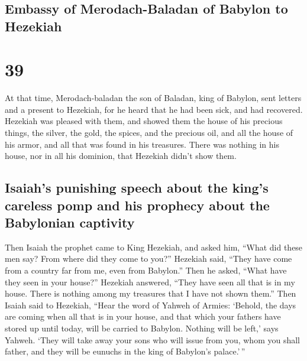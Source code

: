\hypertarget{embassy-of-merodach-baladan-of-babylon-to-hezekiah}{%
\subsection{Embassy of Merodach-Baladan of Babylon to
Hezekiah}\label{embassy-of-merodach-baladan-of-babylon-to-hezekiah}}

\hypertarget{section-38}{%
\section{39}\label{section-38}}

 At that time, Merodach-baladan the son of Baladan, king
of Babylon, sent letters and a present to Hezekiah, for he heard that he
had been sick, and had recovered.  Hezekiah was pleased
with them, and showed them the house of his precious things, the silver,
the gold, the spices, and the precious oil, and all the house of his
armor, and all that was found in his treasures. There was nothing in his
house, nor in all his dominion, that Hezekiah didn't show them.

\hypertarget{isaiahs-punishing-speech-about-the-kings-careless-pomp-and-his-prophecy-about-the-babylonian-captivity}{%
\subsection{Isaiah's punishing speech about the king's careless pomp and
his prophecy about the Babylonian
captivity}\label{isaiahs-punishing-speech-about-the-kings-careless-pomp-and-his-prophecy-about-the-babylonian-captivity}}

 Then Isaiah the prophet came to King Hezekiah, and asked
him, ``What did these men say? From where did they come to you?''
Hezekiah said, ``They have come from a country far from me, even from
Babylon.''  Then he asked, ``What have they seen in your
house?'' Hezekiah answered, ``They have seen all that is in my house.
There is nothing among my treasures that I have not shown them.''
 Then Isaiah said to Hezekiah, ``Hear the word of Yahweh
of Armies:  `Behold, the days are coming when all that is
in your house, and that which your fathers have stored up until today,
will be carried to Babylon. Nothing will be left,' says Yahweh.
 `They will take away your sons who will issue from you,
whom you shall father, and they will be eunuchs in the king of Babylon's
palace.'\,''

